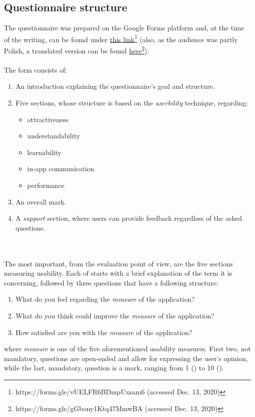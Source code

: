 \subsection{Questionnaire structure}
The questionnaire was prepared on the Google Forms platform and, at the time of the writing, can be found under \href{https://forms.gle/vUELFR6BDmpUxsam6}{this link}\footnote{https://forms.gle/vUELFR6BDmpUxsam6 (accessed Dec. 13, 2020)}  (also, as the audience was partly Polish, a translated version can be found \href{https://forms.gle/gGbony1Ktq47MmwBA}{here}\footnote{https://forms.gle/gGbony1Ktq47MmwBA (accessed Dec. 13, 2020)}).
\\\\
The form consists of:
\begin{enumerate}
    \item An introduction explaining the questionnaire's goal and structure.
    \item Five sections, whose structure is based on the \textit{userbility} technique, regarding:
    \begin{itemize}
        \item attractiveness
        \item understandability
        \item learnability
        \item in-app communication
        \item performance
    \end{itemize}
    \item An overall mark.
    \item A \textit{support} section, where users can provide feedback regardless of the asked questions.
\end{enumerate}
\\\\
The most important, from the evaluation point of view, are the five sections measuring usability. Each of starts with a brief explanation of the term it is concerning, followed by three questions that have a following structure:
\begin{enumerate}
    \item What do you feel regarding the \textit{measure} of the application?
    \item What do you think could improve the \textit{measure} of the application?
    \item How satisfied are you with the \textit{measure} of the application?
\end{enumerate}
where \textit{measure} is one of the five aforementioned usability measures. First two, not mandatory, questions are open-ended and allow for expressing the user's opinion, while the last, mandatory, question is a mark, ranging from 1 () to 10 ().


